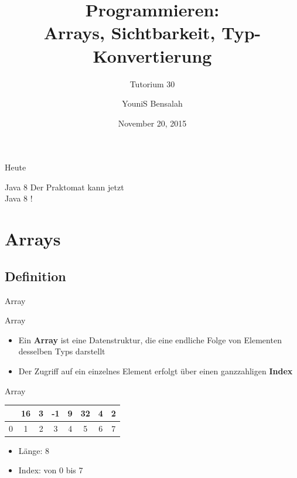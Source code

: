 \documentclass[18pt]{beamer}
\title[Arrays, Sichtbarkeit, Typ-Konvertierung]{Programmieren:\\ Arrays, Sichtbarkeit, Typ-Konvertierung}
\subtitle{Tutorium 30}
\author{YouniS Bensalah}
\date{November 20, 2015}
\institute{Chair for Software Design and Quality}
\begin{document}

\begin{frame}
\titlepage
\end{frame}

\begin{frame}{Heute}
\tableofcontents
\end{frame}

\begin{frame}{Java 8}
    \center
    \Huge{Der Praktomat kann jetzt\\ Java 8 !}
\end{frame}

\section{Arrays}

\subsection{Definition}

\begin{frame}{Array}
    \begin{block}{Array}
        \begin{itemize}
            \item Ein \textbf{Array} ist eine Datenstruktur,
            die eine endliche Folge von Elementen desselben Typs darstellt
            \item Der Zugriff auf ein einzelnes Element erfolgt über einen ganzzahligen \textbf{Index}
        \end{itemize}
    \end{block}
\end{frame}

\begin{frame}{Array}

    \center
    \begin{tabular}{ cccccccc }
        \hline
        \rowcolor{lime}
        \multicolumn{1}{|c|}{7} &
        \multicolumn{1}{c|}{16} &
        \multicolumn{1}{c|}{3} &
        \multicolumn{1}{c|}{-1} &
        \multicolumn{1}{c|}{9} &
        \multicolumn{1}{c|}{32} &
        \multicolumn{1}{c|}{4} &
        \multicolumn{1}{c|}{2}\\
        \hline
        0 & 1 & 2 & 3 & 4 & 5 & 6 & 7\\
    \end{tabular}

    \pause

    \begin{itemize}
        \item Länge: 8
        \item Index: von 0 bis 7
    \end{itemize}

\end{frame}
\end{document}

